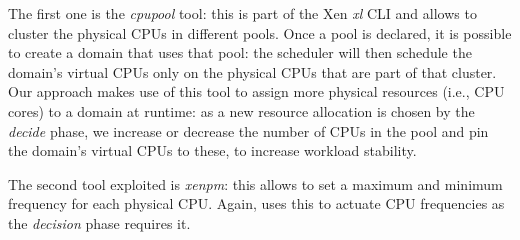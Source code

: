 The first one is the \emph{cpupool} tool: this is part of the Xen \emph{xl} \gls{CLI} and allows to cluster the physical CPUs in different pools. Once a pool is declared, it is possible to create a domain that uses that pool: the scheduler will then schedule the domain's virtual CPUs only on the physical CPUs that are part of that cluster. Our approach makes use of this tool to assign more physical resources (i.e., CPU cores) to a domain at runtime: as a new resource allocation is chosen by the \emph{decide} phase, we increase or decrease the number of CPUs in the pool and pin the domain's virtual CPUs to these, to increase workload stability.

The second tool exploited is \emph{xenpm}: this allows to set a maximum and minimum frequency for each physical CPU. Again, \xempupil uses this to actuate CPU frequencies as the \emph{decision} phase requires it.












